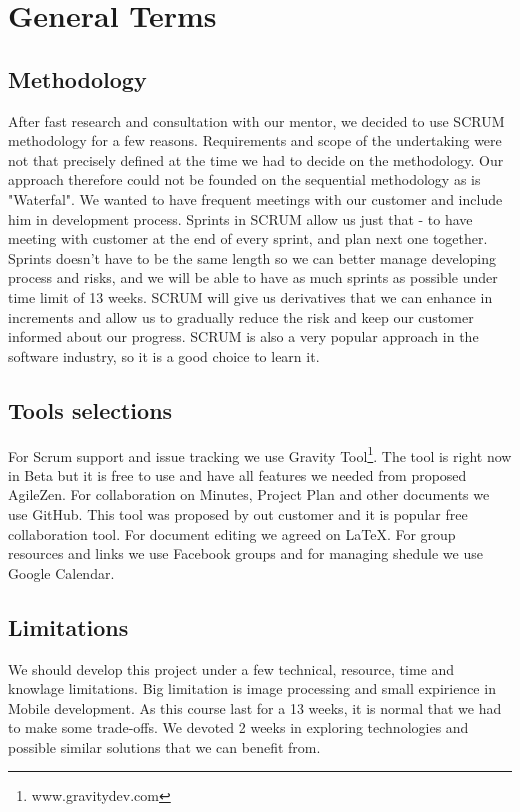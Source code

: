 \documentclass{article}
\begin{document}
\section{General Terms}
\subsection{Methodology}
After fast research and consultation with our mentor, we decided to use SCRUM methodology for a 
few reasons. Requirements and scope of the undertaking were not that precisely defined at the time 
we had to decide on the methodology. Our approach therefore could not be founded on the sequential methodology as is "Waterfal".
We wanted to have frequent meetings with our customer and include him in development process. Sprints in SCRUM allow us just that - 
to have meeting with customer at the end of every sprint, and plan next one together. Sprints doesn't have to be the same length so 
we can better manage developing process and risks, and we will be able to have as much sprints as possible under time limit of 13 weeks. 
SCRUM will give us derivatives that we can enhance in increments and allow us to gradually reduce the risk and keep our customer informed 
about our progress. SCRUM is also a very popular approach in the software industry, so it is a good choice to learn it. 


\subsection{Tools selections}
For Scrum support and issue tracking we use Gravity Tool\footnote{www.gravitydev.com}. 
The tool is right now in Beta but it is free to use and have all features we needed from proposed AgileZen.
For collaboration on Minutes, Project Plan and other documents we use GitHub. This tool was proposed by out customer and it is popular free collaboration tool.
For document editing we agreed on LaTeX.
For group resources and links we use Facebook groups and for managing shedule we use Google Calendar.
 
\subsection{Limitations}
We should develop this project under a few technical, resource, time and knowlage limitations. 
Big limitation is image processing and small expirience in Mobile development.
As this course last for a 13 weeks, it is normal that we had to make some trade-offs. We devoted 2 weeks in exploring technologies and possible similar solutions that we can benefit from.
  
\end{document}
